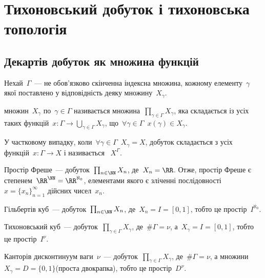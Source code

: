 \newcommand{\CartesianProduct}[1]{\prod_{\gamma\in\Gamma}{#1}_\gamma}
\newcommand{\CartesianNeighbourhood}[1]{U_{K,\{V_\gamma\}_{\gamma\in K}}(#1)}

\chapter{Тихоновський добуток і тихоновська топологія}

\section{Декартів добуток як множина функцій}

Нехай~$\Gamma$~--- не обов'язково скінченна індексна множина, кожному елементу~$\gamma$ якої поставлено у відповідність деяку множину~$X_\gamma$.

\begin{definition}
     множин~$X_\gamma$ по~$\gamma \in \Gamma$ називається множина~$\CartesianProduct{X}$, яка складається із усіх таких функцій~$x: \Gamma \to \bigcup_{\gamma \in \Gamma} X_\gamma$, що~$\forall \gamma \in \Gamma$~$x(\gamma) \in X_\gamma$.
\end{definition}

\begin{remark}
    У частковому випадку, коли~$\forall \gamma \in \Gamma$~$X_\gamma = X$, добуток складається з усіх функцій~$x: \Gamma \to X$ і називається ~$X^\Gamma$.
\end{remark}

\begin{example}
    Простір Фреше~--- добуток~$\prod_{n \in \NN} X_n$, де~$X_n = \RR$. Отже, простір Фреше є степенем~$\RR^\NN = \RR^{\aleph_0}$, елементами якого є зліченні послідовності~$x = \{x_n\}_{n = 1}^\infty$ дійсних чисел~$x_n$.
\end{example}

\begin{example}
    Гільбертів куб~--- добуток~$\prod_{n \in \NN} X_n$, де~$X_n = I = [0, 1]$, тобто це простір~$I^{\aleph_0}$.
\end{example}

\begin{example}
    Тихоновський куб~--- добуток~$\CartesianProduct{X}$, де~$\# \Gamma = \nu$, а~$X_\gamma = I = [0, 1]$, тобто це простір~$I^\nu$.
\end{example}

\begin{example}
    Канторів дисконтинуум ваги~$\nu$~--- добуток~$\CartesianProduct{X}$, де~$\#\Gamma = \nu$, а множини~$X_\gamma = D = \{0, 1\}$(проста двокрапка), тобто це простір~$D^\nu$.
\end{example}

